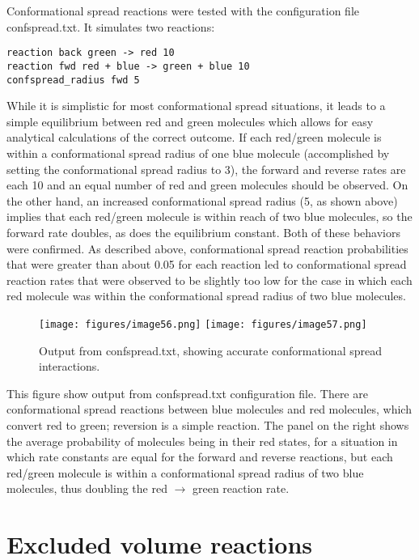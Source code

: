 \documentclass {scrbook}
\begin{document}
Conformational spread reactions were tested with the configuration file confspread.txt. It simulates two reactions:
\begin{lstlisting}[style=SSAC]
reaction back green -> red 10
reaction fwd red + blue -> green + blue 10
confspread_radius fwd 5
\end{lstlisting}
While it is simplistic for most conformational spread situations, it leads to a simple equilibrium between red and green molecules which allows for easy analytical calculations of the correct outcome. If each red/green molecule is within a conformational spread radius of one blue molecule (accomplished by setting the conformational spread radius to 3), the forward and reverse rates are each 10 and an equal number of red and green molecules should be observed. On the other hand, an increased conformational spread radius (5, as shown above) implies that each red/green molecule is within reach of two blue molecules, so the forward rate doubles, as does the equilibrium constant. Both of these behaviors were confirmed. As described above, conformational spread reaction probabilities that were greater than about 0.05 for each reaction led to conformational spread reaction rates that were observed to be slightly too low for the case in which each red molecule was within the conformational spread radius of two blue molecules.

\begin{figure}[h]
\centering
\texttt{[image: figures/image56.png]}
\texttt{[image: figures/image57.png]}
\caption{Output from confspread.txt, showing accurate conformational spread interactions.}
\label{fig:confspread}
\end{figure}

This figure show output from confspread.txt configuration file. There are conformational spread reactions between blue molecules and red molecules, which convert red to green; reversion is a simple reaction. The panel on the right shows the average probability of molecules being in their red states, for a situation in which rate constants are equal for the forward and reverse reactions, but each red/green molecule is within a conformational spread radius of two blue molecules, thus doubling the red $\rightarrow$ green reaction rate.

\section{Excluded volume reactions}
\label{sect:ReactionBounce}
\end{document}
